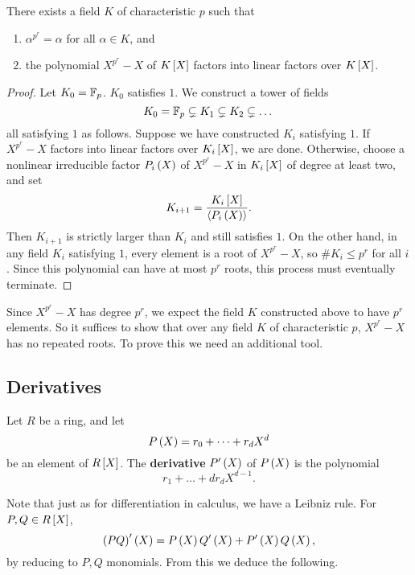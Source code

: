 \begin{corollary}
There exists a field $ K $ of characteristic $ p $ such that
\begin{enumerate}
\item $ \alpha^{p^r} = \alpha $ for all $ \alpha \in K $, and
\item the polynomial $ X^{p^r} - X $ of $ K\sb{X} $ factors into linear factors over $ K\sb{X} $.
\end{enumerate}
\end{corollary}

\begin{proof}
Let $ K_0 = \F_p $. $ K_0 $ satisfies $ 1 $. We construct a tower of fields
$$ K_0 = \F_p \subsetneq K_1 \subsetneq K_2 \subsetneq \dots $$
all satisfying $ 1 $ as follows. Suppose we have constructed $ K_i $ satisfying $ 1 $. If $ X^{p^r} - X $ factors into linear factors over $ K_i\sb{X} $, we are done. Otherwise, choose a nonlinear irreducible factor $ P_i\rb{X} $ of $ X^{p^r} - X $ in $ K_i\sb{X} $ of degree at least two, and set
$$ K_{i + 1} = \dfrac{K_i\sb{X}}{\ab{P_i\rb{X}}}. $$
Then $ K_{i + 1} $ is strictly larger than $ K_i $ and still satisfies $ 1 $. On the other hand, in any field $ K_i $ satisfying $ 1 $, every element is a root of $ X^{p^r} - X $, so $ \#K_i \le p^r $ for all $ i $. Since this polynomial can have at most $ p^r $ roots, this process must eventually terminate.
\end{proof}

Since $ X^{p^r} - X $ has degree $ p^r $, we expect the field $ K $ constructed above to have $ p^r $ elements. So it suffices to show that over any field $ K $ of characteristic $ p $, $ X^{p^r} - X $ has no repeated roots. To prove this we need an additional tool.

\subsection{Derivatives}

\begin{definition}
Let $ R $ be a ring, and let
$$ P\rb{X} = r_0 + \dots + r_dX^d $$
be an element of $ R\sb{X} $. The \textbf{derivative} $ P'\rb{X} $ of $ P\rb{X} $ is the polynomial
$$ r_1 + \dots + dr_dX^{d - 1}. $$
\end{definition}

Note that just as for differentiation in calculus, we have a Leibniz rule. For $ P, Q \in R\sb{X} $,
$$ \rb{PQ}'\rb{X} = P\rb{X}Q'\rb{X} + P'\rb{X}Q\rb{X}, $$
by reducing to $ P, Q $ monomials. From this we deduce the following.

